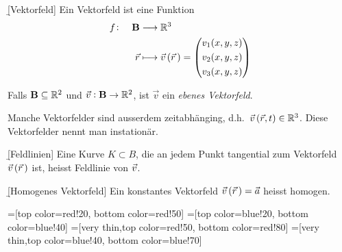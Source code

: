 \documentclass[12pt]{article}
\begin{document}
\begin{defn}{\b{[Vektorfeld]}} Ein Vektorfeld ist eine Funktion
    \begin{align}
        f\colon\quad \mathbf{B} & \longrightarrow\mathbb{R}^3                                \\
        \vec{r}                 & \longmapsto \vec{v}\,(\vec{r}\,)=\begin{pmatrix}
                                                                       v_1(x,y,z) \\[3pt]
                                                                       v_2(x,y,z) \\[3pt]
                                                                       v_3(x,y,z)
                                                                   \end{pmatrix}
    \end{align}
    \begin{rmk}{}{}
    Falls  $\mathbf{B}\subseteq\mathbb{R}^2$ und $\vec{v}: \mathbf{B}\to\mathbb{R}^2$, ist $\vec{v}$ ein \emph{ebenes Vektorfeld}.
    \end{rmk}
    \begin{rmk}{}{}
        Manche Vektorfelder sind ausserdem zeitabhänging, d.h.\ $\vec{v}\,(\vec{r},t)\in\mathbb{R}^3$. Diese Vektorfelder nennt man instationär.
    \end{rmk}
\end{defn}\vspace*{1em}

\begin{defn}{\b{[Feldlinien]}}
    Eine Kurve $K\subset{B}$, die an jedem Punkt tangential zum Vektorfeld $\vec{v}\,(\vec{r}\,)$ ist, heisst Feldlinie von $\vec{v}$.
\end{defn}\vspace*{1em}

\begin{defn}{\b{[Homogenes Vektorfeld]}} Ein konstantes Vektorfeld $\vec{v}\,(\vec{r}\,)=\vec{a}$ heisst homogen.
\end{defn}


=[top color=red!20, bottom color=red!50]
=[top color=blue!20, bottom color=blue!40]
=[very thin,top color=red!50, bottom color=red!80]
=[very thin,top color=blue!40, bottom color=blue!70]
\end{document}
